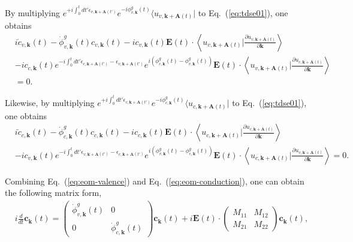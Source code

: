 By multiplying $e^{+i\int^t_0dt' \epsilon_{v,\mathbf k+ \mathbf A(t')}} e^{-i\phi^g_{v,\mathbf k}(t)} \langle u_{v,\mathbf k+\mathbf A(t)}|$ to Eq.~(\ref{eq:tdse01}), one obtains
\begin{align}
	 & i \dot c_{v,\mathbf k}(t) - \dot \phi^g_{v,\mathbf k}(t) c_{v,\mathbf k}(t) - i c_{v,\mathbf k}(t) \mathbf E(t)\cdot \left \langle u_{v,\mathbf k+\mathbf A(t)}\Big |\frac{\partial u_{v,\mathbf k+\mathbf A(t)}}{\partial \mathbf k} \right \rangle \nonumber \\
	 & - i c_{c,\mathbf k}(t) e^{-i\int^t_0dt' \epsilon_{c,\mathbf k+ \mathbf A(t')}-\epsilon_{v,\mathbf k+ \mathbf A(t')}} e^{i\left (\phi^g_{c,\mathbf k}(t)-\phi^g_{v,\mathbf k}(t)\right )}
	\mathbf E(t)\cdot \left \langle u_{v,\mathbf k+\mathbf A(t)}\Big |\frac{\partial u_{c,\mathbf k+\mathbf
	A(t)}}{\partial \mathbf k} \right \rangle                                                                                                                                                                                                                         \\& = 0.
	\label{eq:eom-valence}
\end{align}

Likewise, by multiplying $e^{+i\int^t_0dt' \epsilon_{c,\mathbf k+ \mathbf A(t')}} e^{-i\phi^g_{c,\mathbf k}(t)} \langle u_{c,\mathbf k+\mathbf A(t)}|$ to Eq.~(\ref{eq:tdse01}), one obtains
\begin{align}
	 & i \dot c_{c,\mathbf k}(t) - \dot \phi^g_{c,\mathbf k}(t) c_{c,\mathbf k}(t) - i c_{c,\mathbf k}(t) \mathbf E(t)\cdot \left \langle u_{c,\mathbf k+\mathbf A(t)}\Big |\frac{\partial u_{c,\mathbf k+\mathbf A(t)}}{\partial \mathbf k} \right \rangle \nonumber \\
	 & - i c_{v,\mathbf k}(t) e^{-i\int^t_0dt' \epsilon_{v,\mathbf k+ \mathbf A(t')}-\epsilon_{c,\mathbf k+ \mathbf A(t')}} e^{i\left (\phi^g_{v,\mathbf k}(t)-\phi^g_{c,\mathbf k}(t)\right )}
	\mathbf E(t)\cdot \left \langle u_{c,\mathbf k+\mathbf A(t)}\Big |\frac{\partial u_{v,\mathbf k+\mathbf A(t)}}{\partial \mathbf k} \right \rangle = 0.
	\label{eq:eom-conduction}
\end{align}

Combining Eq.~(\ref{eq:eom-valence}) and Eq.~(\ref{eq:eom-conduction}), one can obtain the following matrix form,
\begin{align}
	 & i\frac{d}{dt} \mathbf c_{\mathbf k}(t) =
	\left(
	\begin{array}{cc}
			\dot \phi^g_{v,\mathbf k}(t) &
			0                              \\
			0                            &
			\dot \phi^g_{c,\mathbf k}(t)
		\end{array}
	\right) \mathbf c_{\mathbf k}(t)
	+i\mathbf E(t)\cdot \left(
	\begin{array}{cc}
			M_{11} & M_{12} \\
			M_{21} & M_{22}
		\end{array}
	\right) \mathbf c_{\mathbf k}(t),
\end{align}

